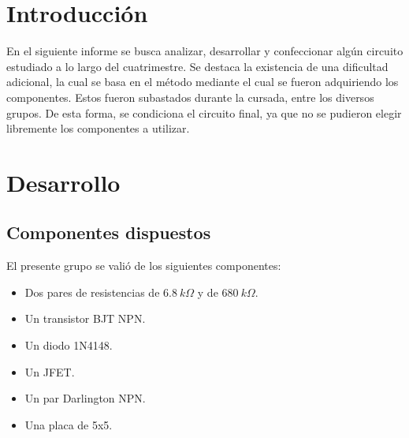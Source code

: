 







\tableofcontents
\newpage

\section{Introducción}
En el siguiente informe se busca analizar, desarrollar y confeccionar algún circuito estudiado a lo largo del cuatrimestre. Se destaca la existencia de una dificultad adicional, la cual se basa en el método mediante el cual se fueron adquiriendo los componentes. Estos fueron subastados durante la cursada, entre los diversos grupos. De esta forma, se condiciona el circuito final, ya que no se pudieron elegir libremente los componentes a utilizar.

\section{Desarrollo}

\subsection{Componentes dispuestos}
El presente grupo se valió de los siguientes componentes:
\begin{itemize}
	\item Dos pares de resistencias de $6.8 \ k\Omega$ y de $680 \ k\Omega$.
	\item Un transistor BJT NPN. 
	\item Un diodo 1N4148.
	\item Un JFET.
	\item Un par Darlington NPN.
	\item Una placa de 5x5.
\end{itemize}

